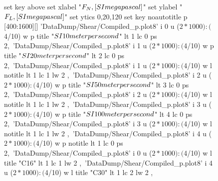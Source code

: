 \documentclass[5p]{elsarticle}
\begin{document}
\begin{figure}[htp]
    	\begin{center}
		\begin{gnuplot}[terminal=epslatex, terminaloptions={size \SERFigwidth cm, \SERFigheight cm color solid}]
			set key above
			set xlabel "$F_N \\, [\\SI{}{\\mega\\pascal}]$"
			set ylabel "$F_L \\, [\\SI{}{\\mega\\pascal}]$"
			set ytics 0,20,120
			set key noautotitle
            p [400:1600][]	'DataDump/Shear/Compiled_p.plot8' i 0 u ($2*1000):($4/10) w p title "$\\SI{10}{\\meter\\per\\second}$" lt 1 lc 0 ps 2,\
                'DataDump/Shear/Compiled_p.plot8' i 1 u ($2*1000):($4/10) w p title "$\\SI{20}{\\meter\\per\\second}$" lt 2 lc 0 ps 2,\
	    		'DataDump/Shear/Compiled_p.plot8' i 1 u ($2*1000):($4/10) w l notitle  lt 1 lc 1 lw 2	,\
                'DataDump/Shear/Compiled_p.plot8' i 2 u ($2*1000):($4/10) w p title "$\\SI{50}{\\meter\\per\\second}$" lt 3 lc 0 ps 2,\
	    		'DataDump/Shear/Compiled_p.plot8' i 2 u ($2*1000):($4/10) w l notitle  lt 1 lc 1 lw 2	,\
                'DataDump/Shear/Compiled_p.plot8' i 3 u ($2*1000):($4/10) w p title "$\\SI{100}{\\meter\\per\\second}$" lt 4 lc 0 ps 2,\
	    		'DataDump/Shear/Compiled_p.plot8' i 3 u ($2*1000):($4/10) w l notitle  lt 1 lc 1 lw 2 ,\
                'DataDump/Shear/Compiled_p.plot8' i 4 u ($2*1000):($4/10) w p notitle  lt 1 lc 0 ps 2,\
	    		'DataDump/Shear/Compiled_p.plot8' i 0 u ($2*1000):($4/10) w l title "C16" lt 1 lc 1 lw 2 ,\
	    		'DataDump/Shear/Compiled_p.plot8' i 4 u ($2*1000):($4/10) w l title "C30" lt 1 lc 2 lw 2 ,\	    		

\end{gnuplot}
\end{center}
\end{figure}
\end{document}
